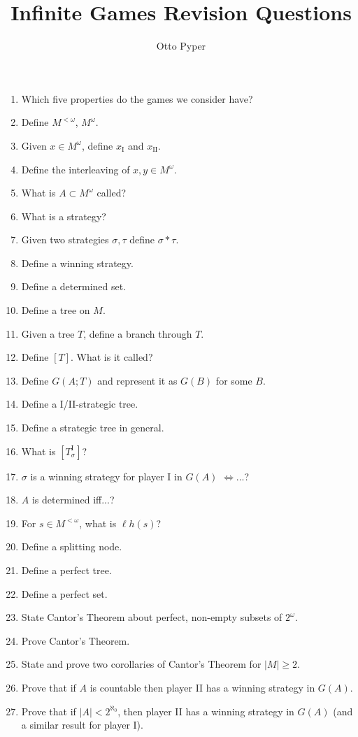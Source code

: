 \documentclass[]{article}
\title{Infinite Games Revision Questions}
\author{Otto Pyper}
\date{}
\newcommand{\I}{\textrm{I}}
\newcommand{\II}{\textrm{II}}
\newcommand{\om}{\omega}
\newcommand{\lom}{{<\omega}}
\newcommand{\lh}{\ell h}
\begin{document}
\maketitle
\begin{enumerate}
    \item Which five properties do the games we consider have?
    \item Define $M^\lom$, $M^\om$.
    \item Given $x \in M^\om$, define $x_\I$ and $x_\II$.
    \item Define the interleaving of $x,y\in M^\om$.
    \item What is $A \subset M^\om$ called?
    \item What is a strategy?
    \item Given two strategies $\sigma, \tau$ define $\sigma \ast \tau$.
    \item Define a winning strategy.
    \item Define a determined set.
    \item Define a tree on $M$.
    \item Given a tree $T$, define a branch through $T$.
    \item Define $[T]$. What is it called?
    \item Define $G(A;T)$ and represent it as $G(B)$ for some $B$.
    \item Define a I/II-strategic tree.
    \item Define a strategic tree in general.
    \item What is $[T^\I_\sigma]$?
    \item $\sigma$ is a winning strategy for player I in $G(A)$ $\iff$...?
    \item $A$ is determined iff...?
    \item For $s \in M^\lom$, what is $\lh(s)$?
    \item Define a splitting node.
    \item Define a perfect tree.
    \item Define a perfect set.
    \item State Cantor's Theorem about perfect, non-empty subsets of $2^\om$.
    \item Prove Cantor's Theorem.
    \item State and prove two corollaries of Cantor's Theorem for $|M| \ge 2$.
    \item Prove that if $A$ is countable then player II has a winning strategy in $G(A)$.
    \item Prove that if $|A| < 2^{\aleph_0}$, then player II has a winning strategy in $G(A)$ (and a similar result for player I).

\end{enumerate}
\end{document}

